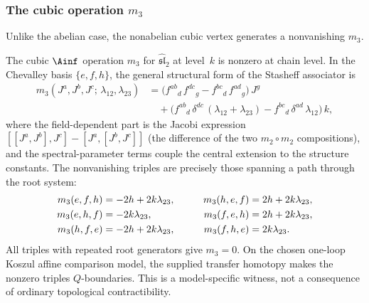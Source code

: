 \subsubsection{The cubic operation $m_3$}

Unlike the abelian case, the nonabelian cubic vertex generates a
nonvanishing $m_3$.

\begin{proposition}
\label{prop:su2-m3}
The cubic $\Ainf$ operation $m_3$ for
$\widehat{\mathfrak{sl}}_2$ at level~$k$ is nonzero at chain
level. In the Chevalley basis $\{e, f, h\}$, the general
structural form of the Stasheff associator is
\begin{equation}\label{eq:su2-m3}
\begin{split}
m_3(J^a, J^b, J^c;\, \lambda_{12}, \lambda_{23})
&= \bigl(f^{ab}{}_d\, f^{dc}{}_g
 - f^{bc}{}_d\, f^{ad}{}_g\bigr)\, J^g \\
&\quad + \bigl(f^{ab}{}_d\, \delta^{dc}\,(\lambda_{12}+\lambda_{23})
 - f^{bc}{}_d\, \delta^{ad}\, \lambda_{12}\bigr)\, k,
\end{split}
\end{equation}
where the field-dependent part is the Jacobi expression
$[[J^a, J^b], J^c] - [J^a, [J^b, J^c]]$ (the difference of
the two $m_2 \circ m_2$ compositions), and the spectral-parameter
terms couple the central extension to the structure constants.
The nonvanishing triples are precisely those spanning a path
through the root system:
\begin{alignat}{2}
m_3(e, f, h) &= -2h + 2k\lambda_{23}, &\qquad
m_3(h, e, f) &= 2h + 2k\lambda_{23}, \notag \\
m_3(e, h, f) &= -2k\lambda_{23}, &\qquad
m_3(f, e, h) &= 2h + 2k\lambda_{23}, \notag \\
m_3(h, f, e) &= -2h + 2k\lambda_{23}, &\qquad
m_3(f, h, e) &= 2k\lambda_{23}. \label{eq:su2-m3-explicit}
\end{alignat}
All triples with repeated root generators give $m_3 = 0$.
On the chosen one-loop Koszul affine comparison model, the supplied
transfer homotopy makes the nonzero triples $Q$-boundaries. This is a
model-specific witness, not a consequence of ordinary
topological contractibility.
\end{proposition}

